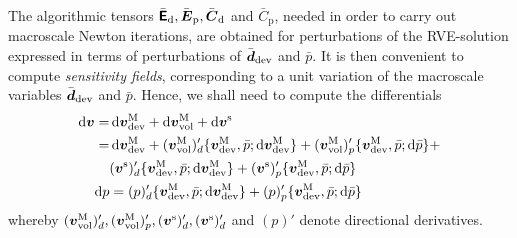 \documentclass[10pt,a4paper]{article}
\newcommand{\ded}{\mathrm{d}}
\newcommand{\dep}{\mathrm{p}}
\begin{document}
The algorithmic tensors $\bar{\tf{E}}_\ded, \bar{\ts E }_\dep, \bar{\ts C}_\ded$ and $\bar{C}_\dep$, needed in order to carry out macroscale Newton iterations, are obtained for
perturbations of the RVE-solution expressed in terms of perturbations of $\bar{\boldsymbol{d}}_{\mathrm{dev}}$ and $\bar{p}$. It is then convenient to compute \emph{sensitivity fields}, corresponding to a unit variation of the macroscale variables $\bar{\boldsymbol{d}}_{\mathrm{dev}}$ and $\bar{p}$. Hence, we shall need to compute the differentials
\begin{align}
    \dif\ta{v}
     = &
    \dif\ta{v}^\macro_\dev + \dif\ta{v}^\macro_\vol + \dif\ta{v}^\fluct
\nonumber \\
     = &
    \dif\ta{v}^\macro_\dev + (\ta{v}^\macro_\vol)'_d \{\ta{v}^\macro_\dev,\bar{p};\dif\ta{v}^\macro_\dev\} + (\ta{v}^\macro_\vol)'_p \{\ta{v}^\macro_\dev,\bar{p};\dif\bar{p}\} +
\nonumber\\
    &
    (\ta{v}^\fluct)'_d\{\ta{v}^\macro_\dev,\bar{p};\dif\ta{v}^\macro_\dev\} + (\ta{v}^\fluct)'_p\{\ta{v}^\macro_\dev,\bar{p};\dif\bar{p}\}
\label{eq215a}
\\
    \dif p
    & = 
    (p)'_d\{\ta{v}^\macro_\dev,\bar{p};\dif\ta{v}^\macro_\dev\} + (p)'_p\{\ta{v}^\macro_\dev,\bar{p};\dif\bar{p}\}
\label{eq215b}
\end{align}
whereby $(\boldsymbol{v}^{\mathrm{M}}_{\mathrm{vol}})'_d, (\boldsymbol{v}^{\mathrm{M}}_{\mathrm{vol}})'_p, (\boldsymbol{v}^{\mathrm{s}})'_d, (\boldsymbol{v}^{\mathrm{s}})'_d$ and $(p)'$ denote directional derivatives.
\end{document}

